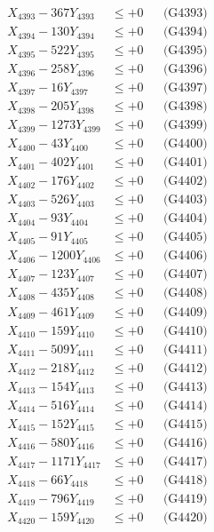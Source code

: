 \documentclass[a4paper,10pt]{article}
\begin{document}
{\begin{align}
X_{4393} - 367Y_{4393} &\leq +0 && \text{(G4393)} \\
X_{4394} - 130Y_{4394} &\leq +0 && \text{(G4394)} \\
X_{4395} - 522Y_{4395} &\leq +0 && \text{(G4395)} \\
X_{4396} - 258Y_{4396} &\leq +0 && \text{(G4396)} \\
X_{4397} - 16Y_{4397} &\leq +0 && \text{(G4397)} \\
X_{4398} - 205Y_{4398} &\leq +0 && \text{(G4398)} \\
X_{4399} - 1273Y_{4399} &\leq +0 && \text{(G4399)} \\
X_{4400} - 43Y_{4400} &\leq +0 && \text{(G4400)} \\
\allowbreak
X_{4401} - 402Y_{4401} &\leq +0 && \text{(G4401)} \\
X_{4402} - 176Y_{4402} &\leq +0 && \text{(G4402)} \\
X_{4403} - 526Y_{4403} &\leq +0 && \text{(G4403)} \\
X_{4404} - 93Y_{4404} &\leq +0 && \text{(G4404)} \\
X_{4405} - 91Y_{4405} &\leq +0 && \text{(G4405)} \\
X_{4406} - 1200Y_{4406} &\leq +0 && \text{(G4406)} \\
X_{4407} - 123Y_{4407} &\leq +0 && \text{(G4407)} \\
X_{4408} - 435Y_{4408} &\leq +0 && \text{(G4408)} \\
X_{4409} - 461Y_{4409} &\leq +0 && \text{(G4409)} \\
X_{4410} - 159Y_{4410} &\leq +0 && \text{(G4410)} \\
\allowbreak
X_{4411} - 509Y_{4411} &\leq +0 && \text{(G4411)} \\
X_{4412} - 218Y_{4412} &\leq +0 && \text{(G4412)} \\
X_{4413} - 154Y_{4413} &\leq +0 && \text{(G4413)} \\
X_{4414} - 516Y_{4414} &\leq +0 && \text{(G4414)} \\
X_{4415} - 152Y_{4415} &\leq +0 && \text{(G4415)} \\
X_{4416} - 580Y_{4416} &\leq +0 && \text{(G4416)} \\
X_{4417} - 1171Y_{4417} &\leq +0 && \text{(G4417)} \\
X_{4418} - 66Y_{4418} &\leq +0 && \text{(G4418)} \\
X_{4419} - 796Y_{4419} &\leq +0 && \text{(G4419)} \\
X_{4420} - 159Y_{4420} &\leq +0 && \text{(G4420)} \\

\end{align}}
\end{document}
